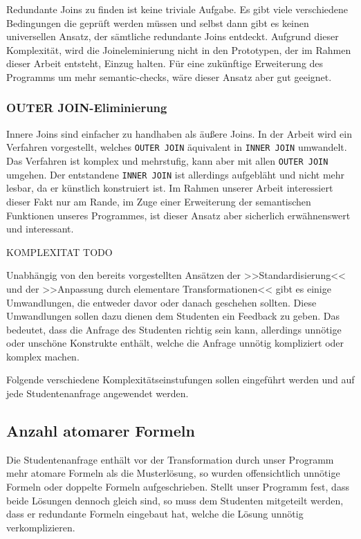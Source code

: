 Redundante Joins zu finden ist keine triviale Aufgabe. Es gibt viele verschiedene Bedingungen die geprüft werden müssen und selbst dann gibt es keinen universellen Ansatz, der sämtliche redundante Joins entdeckt. Aufgrund dieser Komplexität, wird die Joineleminierung nicht in den Prototypen, der im Rahmen dieser Arbeit entsteht, Einzug halten. Für eine zukünftige Erweiterung des Programms um mehr semantic-checks, wäre dieser Ansatz aber gut geeignet.


\subsubsection*{OUTER JOIN-Eliminierung}

Innere Joins sind einfacher zu handhaben als äußere Joins. In der Arbeit \cite{outer2inner} wird ein Verfahren vorgestellt, welches \verb|OUTER JOIN| äquivalent in \verb|INNER JOIN| umwandelt. Das Verfahren ist komplex und mehrstufig, kann aber mit allen \verb|OUTER JOIN| umgehen. Der entstandene \verb|INNER JOIN| ist allerdings aufgebläht und nicht mehr lesbar, da er künstlich konstruiert ist. Im Rahmen unserer Arbeit interessiert dieser Fakt nur am Rande, im Zuge einer Erweiterung der semantischen Funktionen unseres Programmes, ist dieser Ansatz aber sicherlich erwähnenswert und interessant.

KOMPLEXITAT TODO

Unabhängig von den bereits vorgestellten Ansätzen der >>Standardisierung<< und der >>Anpassung durch elementare Transformationen<< gibt es einige Umwandlungen, die entweder davor oder danach geschehen sollten. Diese Umwandlungen sollen dazu dienen dem Studenten ein Feedback zu geben. Das bedeutet, dass die Anfrage des Studenten richtig sein kann, allerdings unnötige oder unschöne Konstrukte enthält, welche die Anfrage unnötig kompliziert oder komplex machen.

Folgende verschiedene Komplexitätseinstufungen sollen eingeführt werden und auf jede Studentenanfrage angewendet werden.

\subsection{Anzahl atomarer Formeln}

Die Studentenanfrage enthält vor der Transformation durch unser Programm mehr atomare Formeln als die Musterlösung, so wurden offensichtlich unnötige Formeln oder doppelte Formeln aufgeschrieben. Stellt unser Programm fest, dass beide Lösungen dennoch gleich sind, so muss dem Studenten mitgeteilt werden, dass er redundante Formeln eingebaut hat, welche die Lösung unnötig verkomplizieren. 

